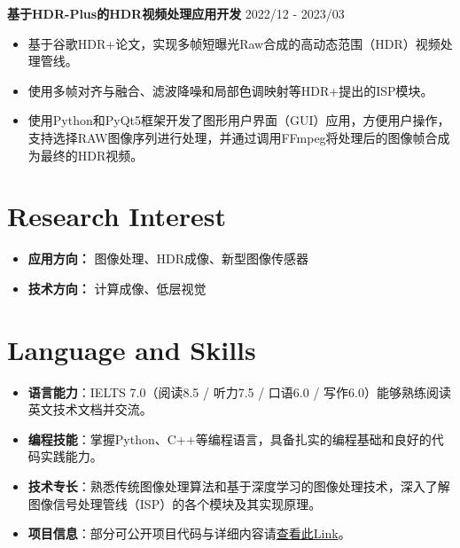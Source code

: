 \documentclass[a4paper,11pt]{article}
\newcommand{\projectspace}{\vspace{8pt}}
\begin{document}
\projectspace
\textbf{基于HDR-Plus的HDR视频处理应用开发} \hfill 2022/12 - 2023/03
\begin{itemize}[noitemsep]
\item 基于谷歌HDR+论文，实现多帧短曝光Raw合成的高动态范围（HDR）视频处理管线。
\item 使用多帧对齐与融合、滤波降噪和局部色调映射等HDR+提出的ISP模块。
\item 使用Python和PyQt5框架开发了图形用户界面（GUI）应用，方便用户操作，支持选择RAW图像序列进行处理，并通过调用FFmpeg将处理后的图像帧合成为最终的HDR视频。
\end{itemize}

\section*{Research Interest}
\begin{itemize}[noitemsep]
\item \textbf{应用方向：} 图像处理、HDR成像、新型图像传感器
\item \textbf{技术方向：} 计算成像、低层视觉
\end{itemize}

\section*{Language and Skills}
\begin{itemize}[noitemsep]
\item \textbf{语言能力}：IELTS 7.0（阅读8.5 / 听力7.5 / 口语6.0 / 写作6.0）能够熟练阅读英文技术文档并交流。
\item \textbf{编程技能}：掌握Python、C++等编程语言，具备扎实的编程基础和良好的代码实践能力。
\item \textbf{技术专长}：熟悉传统图像处理算法和基于深度学习的图像处理技术，深入了解图像信号处理管线（ISP）的各个模块及其实现原理。
\item \textbf{项目信息}：部分可公开项目代码与详细内容请\href{https://zhangsetsail.com/}{查看此Link}。
\end{itemize}
\end{document}
